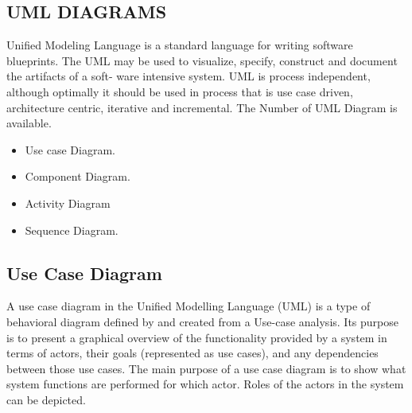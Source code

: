 \documentclass[12pt]{report}
\begin{document}
\clearpage
\justifying
\setlength{\parindent}{4em}
\setlength{\parskip}{0.5em}
\renewcommand{\baselinestretch}{1.5}
\normalsize
\subsection{UML DIAGRAMS}
Unified Modeling Language is a standard language for writing software blueprints. The
UML may be used to visualize, specify, construct and document the artifacts of a soft- ware
intensive system. UML is process independent, although optimally it should be used in
process that is use case driven, architecture centric, iterative and incremental. The Number
of UML Diagram is available.


\begin{itemize}
\item Use case Diagram.

\item Component Diagram.

\item Activity Diagram

\item  Sequence Diagram.

\end{itemize}

\clearpage


\justifying
\setlength{\parindent}{4em}
\setlength{\parskip}{0.5em}
\renewcommand{\baselinestretch}{1.5}
\normalsize
\subsection{Use Case Diagram}
A use case diagram in the Unified Modelling Language (UML) is a type of behavioral
diagram defined by and created from a Use-case analysis. Its purpose is to present a graphical 
overview of the functionality provided by a system in terms of actors, their goals 
(represented as use cases), and any dependencies between those use cases. The main purpose 
of a use case diagram is to show what system functions are performed for which actor. Roles 
of the actors in the system can be depicted.
\end{document}
